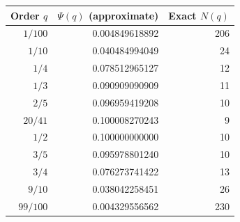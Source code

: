 \begin{tabular}{@{}rrr@{}}
\toprule
Order $q$ & $\Psi(q)$ (approximate) & Exact $N(q)$ \\
\midrule
$1/100$ & 0.004849618892 & 206 \\
$1/10$ & 0.040484994049 & 24 \\
$1/4$ & 0.078512965127 & 12 \\
$1/3$ & 0.090909090909 & 11 \\
$2/5$ & 0.096959419208 & 10 \\
$20/41$ & 0.100008270243 & 9 \\
$1/2$ & 0.100000000000 & 10 \\
$3/5$ & 0.095978801240 & 10 \\
$3/4$ & 0.076273741422 & 13 \\
$9/10$ & 0.038042258451 & 26 \\
$99/100$ & 0.004329556562 & 230 \\
\bottomrule
\end{tabular}
